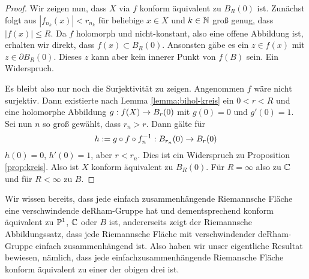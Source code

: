 \begin{proof}
  Wir zeigen nun, dass $X$ via $f$ konform äquivalent zu $B_R(0)$ ist.
  Zunächst folgt aus $|f_{n_k}(x)| < r_{n_k}$ für beliebige $x \in X$
  und $k \in \N$ groß genug, dass $|f(x)| \leq R$. Da $f$
  holomorph und nicht-konstant, also eine offene Abbildung ist, erhalten wir direkt,
  dass $f(x) \subset B_R(0)$. Ansonsten gäbe es ein $z \in f(x)$ mit
  $z \in \partial B_R(0)$. Dieses $z$ kann aber kein innerer Punkt von
  $f(B)$ sein. Ein Widerspruch. 

  Es bleibt also nur noch die Surjektivität zu zeigen. 
  Angenommen $f$ wäre nicht surjektiv. Dann existierte nach Lemma
  \ref{lemma:bihol-kreis} ein $0 < r < R$ und eine holomorphe
  Abbildung $g: f(X) \ra B_r(0)$ mit $g(0) = 0$ und $g'(0) = 1$. 
  Sei nun $n$ so groß gewählt, dass $r_n > r$. Dann gälte für
  \[
  h:= g \circ f \circ f^{-1}_n : B_{r_n}(0) \ra B_r(0)
  \]
  $h(0)=0$, $h'(0) = 1$, aber $r < r_n$. Dies ist ein Widerspruch zu
  Proposition \ref{prop:kreis}. 
  Also ist $X$ konform äquivalent zu $B_R(0)$. Für $R = \infty$ also
  zu $\C$ und für $R < \infty$ zu $B$.
\end{proof}

\begin{rem}
  Wir wissen bereits, dass jede einfach zusammenhängende Riemannsche
  Fläche eine verschwindende deRham-Gruppe hat und dementsprechend
  konform äquivalent zu $\P^1$, $\C$ oder $B$ ist, andererseits zeigt
  der Riemannsche Abbildungssatz, dass jede Riemannsche Fläche mit
  verschwindender deRham-Gruppe einfach zusammenhängend ist. Also
  haben wir unser eigentliche Resultat bewiesen, nämlich, dass jede
  einfachzusammenhängende Riemansche Fläche konform äquivalent zu
  einer der obigen drei ist.
\end{rem}

